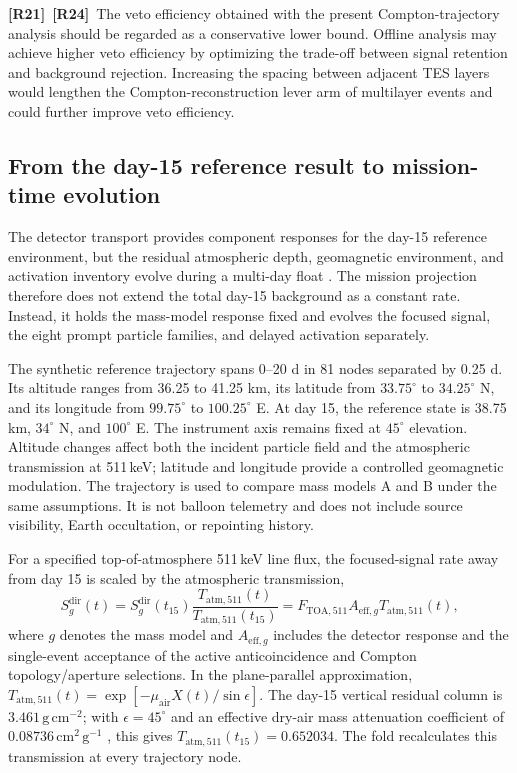 \documentclass[11pt]{article}
\newcommand{\revmark}[1]{\textcolor{revisionblue}{\textbf{[R#1]}}\ }
\newcommand{\revblue}[1]{\textcolor{revisionblue}{#1}}
\begin{document}
\revmark{21}\revmark{24}\revblue{The veto efficiency obtained with the present Compton-trajectory analysis should be regarded as a conservative lower bound. Offline analysis may achieve higher veto efficiency by optimizing the trade-off between signal retention and background rejection. Increasing the spacing between adjacent TES layers would lengthen the Compton-reconstruction lever arm of multilayer events and could further improve veto efficiency.}

\subsection{From the day-15 reference result to mission-time evolution}
\label{sec:mission_time_fold}

The detector transport provides component responses for the day-15 reference
environment, but the residual atmospheric depth, geomagnetic environment, and
activation inventory evolve during a multi-day float
\cite{Gallego2025Balloon,Kierans2017}. The mission projection therefore does not
extend the total day-15 background as a constant rate. Instead, it holds the
mass-model response fixed and evolves the focused signal, the eight prompt
particle families, and delayed activation separately.

The synthetic reference trajectory spans 0--20 d in 81 nodes separated by
0.25 d. Its altitude ranges from 36.25 to 41.25 km, its latitude from
$33.75^\circ$ to $34.25^\circ$ N, and its longitude from $99.75^\circ$ to
$100.25^\circ$ E. At day 15, the reference state is 38.75 km,
$34^\circ$ N, and $100^\circ$ E. The instrument axis remains fixed at
$45^\circ$ elevation. Altitude changes affect both the incident
particle field and the atmospheric transmission at 511\,keV; latitude and
longitude provide a controlled geomagnetic modulation. The trajectory is used
to compare mass models A and B under the same assumptions. It is not balloon
telemetry and does not include source visibility, Earth occultation, or
repointing history.

For a specified top-of-atmosphere 511\,keV line flux, the focused-signal rate
away from day 15 is scaled by the atmospheric transmission,
\begin{equation}
 S^{\mathrm{dir}}_g(t)
 =S^{\mathrm{dir}}_g(t_{15})
 \frac{T_{\mathrm{atm},511}(t)}{T_{\mathrm{atm},511}(t_{15})}
 =F_{\mathrm{TOA},511}A_{\mathrm{eff},g}T_{\mathrm{atm},511}(t),
 \label{eq:mission_signal}
\end{equation}
where $g$ denotes the mass model and $A_{\mathrm{eff},g}$ includes the detector
response and the single-event acceptance of the active anticoincidence and
Compton topology/aperture selections. In the plane-parallel approximation,
$T_{\mathrm{atm},511}(t)=\exp[-\mu_{\mathrm{air}}X(t)/\sin\epsilon]$. The
day-15 vertical residual column is $3.461\,\mathrm{g\,cm^{-2}}$; with
$\epsilon=45^\circ$ and an effective dry-air mass attenuation coefficient of
$0.08736\,\mathrm{cm^2\,g^{-1}}$ \cite{NISTXCOM}, this gives
$T_{\mathrm{atm},511}(t_{15})=0.652034$. The fold recalculates this transmission
at every trajectory node.
\end{document}
